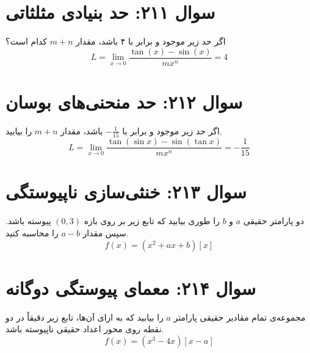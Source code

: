 \documentclass[12pt]{article}
\begin{document}
\section*{سوال ۲۱۱: حد بنیادی مثلثاتی}
اگر حد زیر موجود و برابر با ۴ باشد، مقدار \(m+n\) کدام است؟
\begin{displaymath}
	L = \lim_{x \to 0} \frac{\tan(x) - \sin(x)}{mx^n} = 4
\end{displaymath}

\vspace{1cm}
\hrulefill
\vspace{1cm}


\section*{سوال ۲۱۲: حد منحنی‌های بوسان}
اگر حد زیر موجود و برابر با \(-\frac{1}{15}\) باشد، مقدار \(m+n\) را بیابید.
\begin{displaymath}
	L = \lim_{x \to 0} \frac{\tan(\sin x) - \sin(\tan x)}{mx^n} = -\frac{1}{15}
\end{displaymath}

\vspace{1cm}
\hrulefill
\vspace{1cm}


\section*{سوال ۲۱۳: خنثی‌سازی ناپیوستگی}
دو پارامتر حقیقی \(a\) و \(b\) را طوری بیابید که تابع زیر بر روی بازه \( (0, 3) \) پیوسته باشد. سپس مقدار \(a-b\) را محاسبه کنید.
\begin{displaymath}
	f(x) = (x^2 + ax + b)[x]
\end{displaymath}

\vspace{1cm}
\hrulefill
\vspace{1cm}


\section*{سوال ۲۱۴: معمای پیوستگی دوگانه}
مجموعه‌ی تمام مقادیر حقیقی پارامتر \(a\) را بیابید که به ازای آن‌ها، تابع زیر دقیقاً در دو نقطه روی محور اعداد حقیقی ناپیوسته باشد.
\begin{displaymath}
	f(x) = (x^3 - 4x)[x-a]
\end{displaymath}
\end{document}
